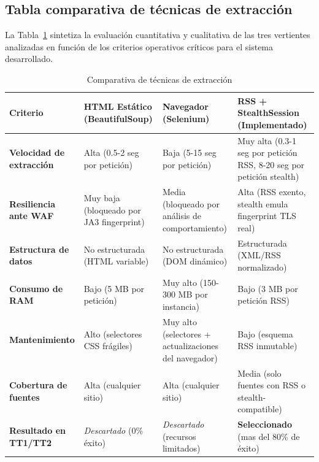 \subsection{Tabla comparativa de técnicas de extracción}
\label{subsec:ea_tabla_scraping}

La Tabla~\ref{tab:comparativa_scraping} sintetiza la evaluación cuantitativa y
cualitativa de las tres vertientes analizadas en función de los criterios
operativos críticos para el sistema desarrollado.

\vspace{0.5cm}
\begin{table}[htbp]
\centering
\caption{Comparativa de técnicas de extracción}
\label{tab:comparativa_scraping}
\begin{tabular}{|p{2.8cm}|p{2.8cm}|p{2.8cm}|p{3.2cm}|}
\hline
\textbf{Criterio} &
\textbf{HTML Estático} \newline (BeautifulSoup) &
\textbf{Navegador} \newline (Selenium) &
\textbf{RSS + StealthSession} \newline (Implementado) \\
\hline
\textbf{Velocidad de extracción} &
Alta (0.5-2 seg por petición) &
Baja (5-15 seg por petición) &
Muy alta (0.3-1 seg por petición RSS, 8-20 seg por petición stealth) \\
\hline
\textbf{Resiliencia ante WAF} &
Muy baja (bloqueado por JA3 fingerprint) &
Media (bloqueado por análisis de comportamiento) &
Alta (RSS exento, stealth emula fingerprint TLS real) \\
\hline
\textbf{Estructura de datos} &
No estructurada (HTML variable) &
No estructurada (DOM dinámico) &
Estructurada (XML/RSS normalizado) \\
\hline
\textbf{Consumo de RAM} &
Bajo (5 MB por petición) &
Muy alto (150-300 MB por instancia) &
Bajo (3 MB por petición RSS) \\
\hline
\textbf{Mantenimiento} &
Alto (selectores CSS frágiles) &
Muy alto (selectores + actualizaciones del navegador) &
Bajo (esquema RSS inmutable) \\
\hline
\textbf{Cobertura de fuentes} &
Alta (cualquier sitio) &
Alta (cualquier sitio) &
Media (solo fuentes con RSS o stealth-compatible) \\
\hline
\textbf{Resultado en TT1/TT2} &
\textit{Descartado} (0\% éxito) &
\textit{Descartado} (recursos limitados) &
\textbf{Seleccionado} (mas del 80\% de éxito) \\
\hline
\end{tabular}
\end{table}
\vspace{0.4cm}

